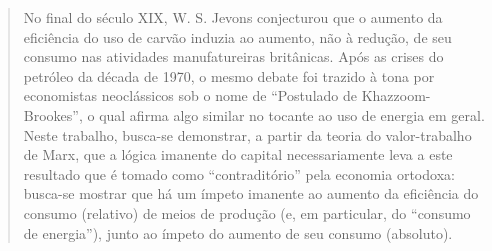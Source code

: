 \documentclass[12pt, openright, chapter=TITLE]{economia} %
\begin{document}


\imprimircapa
\imprimirfolhaderosto*		

%	
\clearpage

%	

%		
					


\sumario



\textual

\begin{abstract}
    No final do século XIX, W. S. Jevons conjecturou que o aumento da eficiência do uso de carvão induzia ao aumento, não à redução, de seu consumo nas atividades manufatureiras britânicas. Após as crises do petróleo da década de 1970, o mesmo debate foi trazido à tona por economistas neoclássicos sob o nome de ``Postulado de Khazzoom-Brookes'', o qual afirma algo similar no tocante ao uso de energia em geral. Neste trabalho, busca-se demonstrar, a partir da teoria do valor-trabalho de Marx, que a lógica imanente do capital necessariamente leva a este resultado que é tomado como ``contraditório'' pela economia ortodoxa: busca-se mostrar que há um ímpeto imanente ao aumento da eficiência do consumo (relativo) de meios de produção (e, em particular, do ``consumo de energia''), junto ao ímpeto do aumento de seu consumo (absoluto).
\end{abstract}


\end{document}

